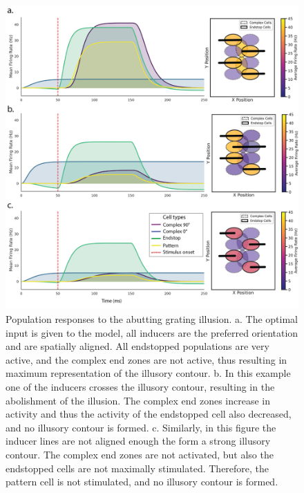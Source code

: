 \documentclass[12pt]{article}
\begin{document}
\begin{figure}[H]
  \centering
  \includegraphics[width=1.0 \textwidth]{adjusted_figures/Figure_Population.png}
  \caption{Population responses to the abutting grating illusion. a. The optimal input is given to the model, all inducers are the preferred orientation and are spatially aligned. All endstopped populations are very active, and the complex end zones are not active, thus resulting in maximum representation of the illusory contour. b. In this example one of the inducers crosses the illusory contour, resulting in the abolishment of the illusion. The complex end zones increase in activity and thus the activity of the endstopped cell also decreased, and no illusory contour is formed. c. Similarly, in this figure the inducer lines are not aligned enough the form a strong illusory contour. The complex end zones are not activated, but also the endstopped cells are not maximally stimulated. Therefore, the pattern cell is not stimulated, and no illusory contour is formed.}
  \label{fig:population_contours}
\end{figure}

\newpage
\end{document}
